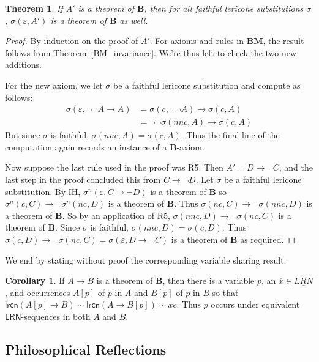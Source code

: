 \documentclass{amsart}
\newtheorem{theorem}{Theorem}
\theoremstyle{definition}
\newtheorem{cor}{Corollary}
\newcommand{\LRN}{\mathsf{LRN}}
\newcommand{\lrcn}{\mathsf{lrcn}}
\newcommand{\BM}{\mathbf{BM}}
\begin{document}
\begin{theorem}
    If $A'$ is a theorem of $\mathbf{B}$, then for all faithful lericone substitutions $\sigma$, $\sigma(\varepsilon,A')$ is a theorem of $\mathbf{B}$ as well.
\end{theorem}
\begin{proof}
    By induction on the proof of $A'$. For axioms and rules in $\BM$, the result follows from Theorem~\ref{BM_invariance}. We're thus left to check the two new additions.

    For the new axiom, we let $\sigma$ be a faithful lericone substitution and compute as follows:
    \begin{align*}
        \sigma(\varepsilon,\neg\neg A\to A) & = \sigma(c,\neg\neg A)\to\sigma(c,A) \\
         & = \neg\neg\sigma(nnc,A)\to\sigma(c,A)
    \end{align*}
    But since $\sigma$ is faithful, $\sigma(nnc,A)=\sigma(c,A)$. Thus the final line of the computation again records an instance of a $\mathbf{B}$-axiom.

    Now suppose the last rule used in the proof was R5. Then $A'=D\to\neg C$, and the last step in the proof concluded this from $C\to\neg D$. Let $\sigma$ be a faithful lericone substitution. By IH, $\sigma^n(\varepsilon,C\to\neg D)$ is a theorem of $\mathbf{B}$ so $\sigma^n(c,C)\to\neg\sigma^n(nc,D)$ is a theorem of $\mathbf{B}$. Thus $\sigma(nc,C)\to\neg\sigma(nnc,D)$ is a theorem of $\mathbf{B}$. So by an application of R5, $\sigma(nnc,D)\to\neg\sigma(nc,C)$ is a theorem of $\mathbf{B}$. Since $\sigma$ is faithful, $\sigma(nnc,D)=\sigma(c,D)$. Thus $\sigma(c,D)\to\neg\sigma(nc,C)=\sigma(\varepsilon,D\to\neg C)$ is a theorem of $\mathbf{B}$ as required.
\end{proof}

We end by stating without proof the corresponding variable sharing result.
\begin{cor}\label{B_var_shar}
    If $A\to B$ is a theorem of $\mathbf{B}$, then there is a variable $p$, an $\overline{x}\in\underline{LRN}$, and occurrences $A[p]$ of $p$ in $A$ and $B[p]$ of $p$ in $B$ so that $\lrcn(A[p]\to B)\sim\lrcn(A\to B[p])\sim\overline{x}c$. Thus $p$ occurs under equivalent $\LRN$-sequences in both $A$ and $B$. 
\end{cor}

\subsection{Philosophical Reflections}
\end{document}

